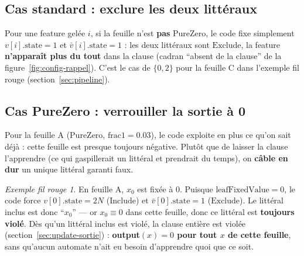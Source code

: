 \documentclass[12pt,a4paper]{article}
\newcommand{\Inc}{\ensuremath{\mathrm{Include}}}
\newcommand{\Exc}{\ensuremath{\mathrm{Exclude}}}
\newcommand{\vbar}{\bar{v}}
\theoremstyle{remark}
\newtheorem{exemple}{Exemple fil rouge}[section]
\begin{document}
\subsection{Cas standard : exclure les deux littéraux}

Pour une feature gelée $i$, si la feuille n'est \textbf{pas} PureZero, le code fixe
simplement $v[i].\mathrm{state}=1$ et $\vbar[i].\mathrm{state}=1$ : les deux
littéraux sont \Exc, la feature \textbf{n'apparaît plus du tout} dans la clause
(cadran ``absent de la clause'' de la figure~\ref{fig:config-rappel}). C'est le
cas de $\{0,2\}$ pour la feuille C dans l'exemple fil rouge (section~\ref{sec:pipeline}).

\subsection{Cas PureZero : verrouiller la sortie à 0}

Pour la feuille A (PureZero, $\mathrm{frac1}=0.03$), le code exploite en plus ce
qu'on sait déjà : cette feuille est presque toujours négative. Plutôt que de
laisser la clause l'apprendre (ce qui gaspillerait un littéral et prendrait du
temps), on \textbf{câble en dur} un unique littéral garanti faux.

\begin{exemple}
En feuille A, $x_0$ est fixée à $0$. Puisque $\mathrm{leafFixedValue}=0$, le code
force $v[0].\mathrm{state}=2N$ (\Inc) et $\vbar[0].\mathrm{state}=1$ (\Exc). Le
littéral inclus est donc ``$x_0$'' --- or $x_0\equiv0$ dans cette feuille, donc ce
littéral est \textbf{toujours violé}. Dès qu'un littéral inclus est violé, la
clause entière est violée (section~\ref{sec:update-sortie}) : \textbf{output$(x)=0$
pour tout $x$ de cette feuille}, sans qu'aucun automate n'ait eu besoin
d'apprendre quoi que ce soit.
\end{exemple}
\end{document}
